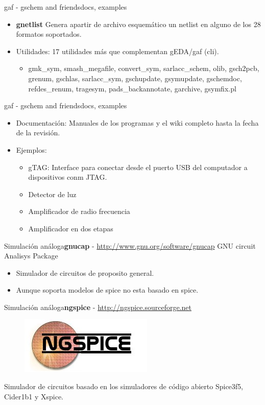\documentclass{beamer}
\begin{document}
\begin{frame}{gaf - gschem and friends}{docs, examples}
  \begin{itemize}
  \item \textbf{gnetlist} Genera apartir de archivo esquemático un netlist en alguno de los 28 formatos soportados.
    \pause
  \item Utilidades: 17 utilidades más que complementan gEDA/gaf (cli).
    \begin{itemize}
    \item gmk\_sym, smash\_megafile, convert\_sym, sarlacc\_schem, olib, gsch2pcb, grenum, gschlas, sarlacc\_sym, gschupdate, gsymupdate, gschemdoc, refdes\_renum, tragesym, pads\_backannotate, garchive, gsymfix.pl
    \end{itemize}
  \end{itemize}
\end{frame}

\begin{frame}{gaf - gschem and friends}{docs, examples}
  \begin{itemize}
  \item Documentación: Manuales de los programas y el wiki completo hasta la fecha de la revisión.
    \pause
  \item Ejemplos:
    \begin{itemize}
    \item gTAG: Interface para conectar desde el puerto USB del computador a dispositivos conm JTAG.
    \item Detector de luz
    \item Amplificador de radio frecuencia
    \item Amplificador en dos etapas
    \end{itemize}
  \end{itemize}
\end{frame}

\begin{frame}{Simulación análoga}{\textbf{gnucap} - \url{http://www.gnu.org/software/gnucap}}
  GNU circuit Analisys Package
  \begin{itemize}
  \item Simulador de circuitos de proposito general.
  \item Aunque soporta modelos de spice no esta basado en spice.
  \end{itemize}
\end{frame}

\begin{frame}{Simulación análoga}{\textbf{ngspice} - \url{http://ngspice.sourceforge.net}}
  \begin{figure}[!h]
    \centering
    \includegraphics[scale=0.5]{img/nglogo.jpg}
  \end{figure}
  Simulador de circuitos basado en los simuladores de código abierto Spice3f5, Cider1b1 y Xspice.
\end{frame}
\end{document}
